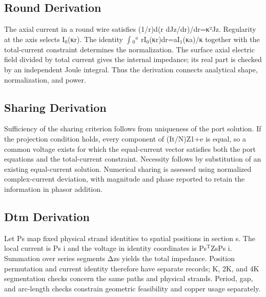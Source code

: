 \documentclass[journal,10pt]{IEEEtran}
\begin{document}
\subsection*{Round Derivation}
\hypertarget{S1.round_derivation.heading}{}
The axial current in a round wire satisfies (1/r)d(r dJz/dr)/dr=κ²Jz. Regularity at the axis selects I\(_0\)(κr). The identity \(\int\)\(_0\)\(^a\) rI\(_0\)(κr)dr=aI\(_1\)(κa)/κ together with the total-current constraint determines the normalization. The surface axial electric field divided by total current gives the internal impedance; its real part is checked by an independent Joule integral. Thus the derivation connects analytical shape, normalization, and power.


\subsection*{Sharing Derivation}
\hypertarget{S1.sharing_derivation.heading}{}
Sufficiency of the sharing criterion follows from uniqueness of the port solution. If the projection condition holds, every component of (It/N)Z1+e is equal, so a common voltage exists for which the equal-current vector satisfies both the port equations and the total-current constraint. Necessity follows by substitution of an existing equal-current solution. Numerical sharing is assessed using normalized complex-current deviation, with magnitude and phase reported to retain the information in phasor addition.


\subsection*{Dtm Derivation}
\hypertarget{S1.dtm_derivation.heading}{}
Let Ps map fixed physical strand identities to spatial positions in section s. The local current is Ps i and the voltage in identity coordinates is Ps\(^{\mathrm T}\)ZsPs i. Summation over series segments Δzs yields the total impedance. Position permutation and current identity therefore have separate records; K, 2K, and 4K segmentation checks concern the same paths and physical strands. Period, gap, and arc-length checks constrain geometric feasibility and copper usage separately.
\end{document}
